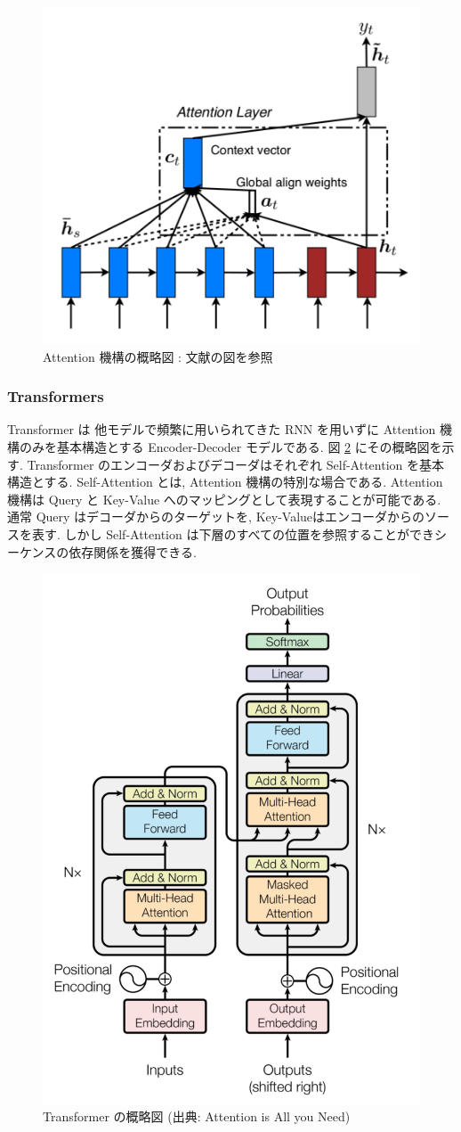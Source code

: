 \begin{figure}[!h]
  \centering
  \includegraphics[width=0.6\hsize]{doc/figures/attention.png}
  \caption{Attention 機構の概略図 : 文献の図を参照}
  \label{fig:attention}
\end{figure}

\newpage
\changeindent{0cm}
\subsubsection{Transformers}
\changeindent{2cm}

Transformer \cite{transformer} は 他モデルで頻繁に用いられてきた RNN を用いずに
Attention 機構のみを基本構造とする Encoder-Decoder モデルである.
図 \ref{fig:transformer} にその概略図を示す.
Transformer のエンコーダおよびデコーダはそれぞれ Self-Attention を基本構造とする. Self-Attention とは, Attention 機構の特別な場合である.
Attention 機構は Query と Key-Value へのマッピングとして表現することが可能である.
通常 Query はデコーダからのターゲットを, Key-Valueはエンコーダからのソースを表す.
しかし Self-Attention は下層のすべての位置を参照することができシーケンスの依存関係を獲得できる.

\begin{figure}[!h]
  \centering
  \includegraphics[width=0.5\hsize]{doc/figures/transformer.png}
  \caption{Transformer の概略図 (出典: Attention is All you Need)}
  \label{fig:transformer}
\end{figure}

